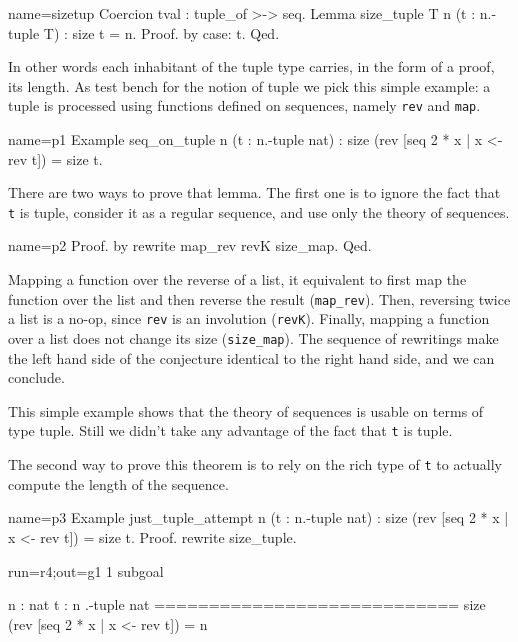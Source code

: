 \begin{coq}{name=sizetup}{}
Coercion tval : tuple_of >-> seq.
Lemma size_tuple {T n} (t : n.-tuple T) : size t = n.
Proof. by case: t. Qed.
\end{coq}

In other words each inhabitant of the tuple type carries,
in the form of a proof, its length.  As test bench for the notion
of tuple we pick this simple example: a tuple is processed using
functions defined on sequences, namely \lstinline/rev/ and
\lstinline/map/.

\begin{coq}{name=p1}{}
Example seq_on_tuple n (t : n.-tuple nat) :
  size (rev [seq 2 * x | x <- rev t]) = size t.
\end{coq}

There are two ways to prove that lemma.  The first one is
to ignore the fact that \lstinline/t/ is tuple, consider it
as a regular sequence, and use only the theory of sequences.

\begin{coq}{name=p2}{}
Proof. by rewrite map_rev revK size_map. Qed.
\end{coq}

Mapping a function over the reverse of a list, it equivalent to
first map the function over the list and then reverse the result
(\lstinline/map_rev/).  Then, reversing twice a list is a no-op, since
\lstinline/rev/ is an involution
(\lstinline/revK/).  Finally, mapping a function over a list does not
change its size (\lstinline/size_map/).  The sequence of rewritings
make the left hand side of the conjecture identical to the right hand
side, and we can conclude.

This simple example shows that the theory of sequences is usable
on terms of type tuple.  Still we didn't take any advantage of
the fact that  \lstinline/t/ is tuple.

The second way to prove this theorem is to rely on the rich type
of \lstinline/t/ to actually compute the length of the sequence.

\begin{coq}{name=p3}{}
Example just_tuple_attempt n (t : n.-tuple nat) :
  size (rev [seq 2 * x | x <- rev t]) = size t.
Proof. rewrite size_tuple.
\end{coq}
\begin{coqout}{run=r4;out=g1}{}
1 subgoal

 n : nat
 t : n .-tuple nat
 ============================
 size (rev [seq 2 * x | x <- rev t]) = n
\end{coqout}

